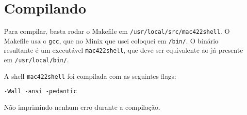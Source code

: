 \documentclass{amsart}
\theoremstyle{plain}
\newcommand{\code}[1]{\lstinline[mathescape=true]{#1}}
\begin{document}
\section{Compilando}

Para compilar, basta rodar o Makefile em \code{/usr/local/src/mac422shell}. O Makefile usa o
\code{gcc}, que no Minix que usei coloquei em \code{/bin/}. O binário resultante é um executável
\code{mac422shell}, que deve ser equivalente ao já presente em \code{/usr/local/bin/}.

A shell \code{mac422shell} foi compilada com as seguintes flags:

\begin{lstlisting}[style=nonumbers]
  -Wall -ansi -pedantic
\end{lstlisting}

Não imprimindo nenhum erro durante a compilação.
\end{document}
